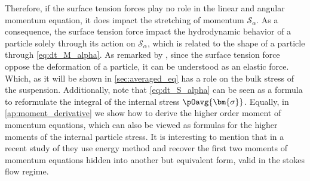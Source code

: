 Therefore, if the surface tension forces play no role in the linear and angular momentum equation, it does impact the stretching of momentum $\mathcal{S}_\alpha$.
As a consequence, the surface tension force impact the hydrodynamic behavior of a particle solely through its action on $\mathcal{S}_\alpha$, which is related to the shape of a particle through \ref{eq:dt_M_alpha}.
As remarked by \citet{batchelor1970stress}, since the surface tension force oppose the deformation of a particle, it can be understood as an elastic force. 
Which, as it will be shown in \ref{sec:averaged_eq} has a role on the bulk stress of the suspension. 
Additionally, note that \ref{eq:dt_S_alpha} can be seen as a formula to reformulate the integral of the internal stress $\pOavg{\bm{\sigma}}$.
Equally, in \ref{ap:moment_derivative} we show how to derive the higher order moment of momentum equations, which can also be viewed as formulas for the higher moments of the internal particle stress. 
It is interesting to mention that in a recent study of \citet{dolata2021faxen} they use energy method and recover the first two moments of momentum equations hidden into another but equivalent form, valid in the stokes flow regime. 


